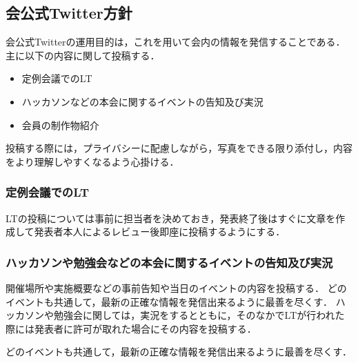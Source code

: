 \subsection*{会公式Twitter方針}


会公式Twitterの運用目的は，これを用いて会内の情報を発信することである．主に以下の内容に関して投稿する．

\begin{itemize}
\item 定例会議でのLT
\item ハッカソンなどの本会に関するイベントの告知及び実況
\item 会員の制作物紹介
\end{itemize}

投稿する際には，プライバシーに配慮しながら，写真をできる限り添付し，内容をより理解しやすくなるよう心掛ける．

\subsubsection*{定例会議でのLT}
LTの投稿については事前に担当者を決めておき，発表終了後はすぐに文章を作成して発表者本人によるレビュー後即座に投稿するようにする．

\subsubsection*{ハッカソンや勉強会などの本会に関するイベントの告知及び実況}
開催場所や実施概要などの事前告知や当日のイベントの内容を投稿する．
どのイベントも共通して，最新の正確な情報を発信出来るように最善を尽くす．
ハッカソンや勉強会に関しては，実況をするとともに，そのなかでLTが行われた際には発表者に許可が取れた場合にその内容を投稿する．

どのイベントも共通して，最新の正確な情報を発信出来るように最善を尽くす．
